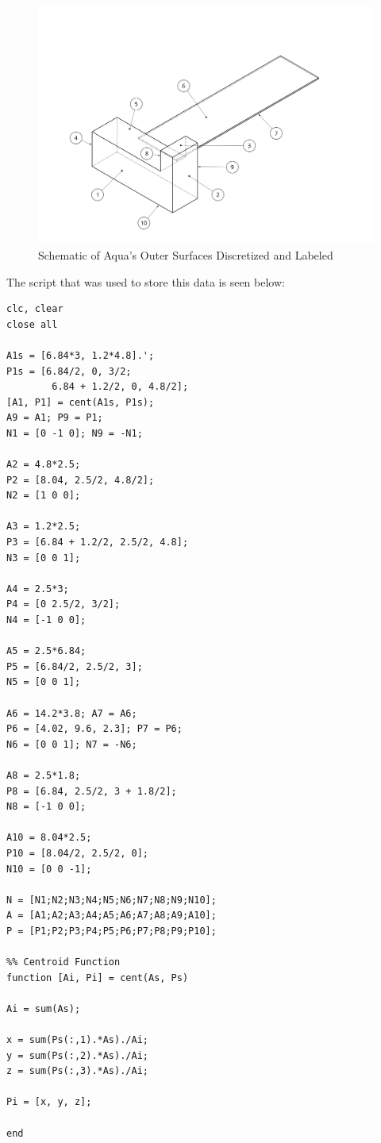 \begin{figure}[H]
    \centering
    \includegraphics[width = 14cm]{Images/AquaSurfaces.png}
    \caption{Schematic of Aqua's Outer Surfaces Discretized and Labeled}
    \label{fig:surface_labels}
\end{figure}

The script that was used to store this data is seen below:


\begin{lstlisting}
clc, clear
close all

A1s = [6.84*3, 1.2*4.8].';
P1s = [6.84/2, 0, 3/2;
        6.84 + 1.2/2, 0, 4.8/2];
[A1, P1] = cent(A1s, P1s);
A9 = A1; P9 = P1;
N1 = [0 -1 0]; N9 = -N1;

A2 = 4.8*2.5;
P2 = [8.04, 2.5/2, 4.8/2];
N2 = [1 0 0];

A3 = 1.2*2.5;
P3 = [6.84 + 1.2/2, 2.5/2, 4.8];
N3 = [0 0 1];

A4 = 2.5*3;
P4 = [0 2.5/2, 3/2];
N4 = [-1 0 0];

A5 = 2.5*6.84;
P5 = [6.84/2, 2.5/2, 3];
N5 = [0 0 1];

A6 = 14.2*3.8; A7 = A6;
P6 = [4.02, 9.6, 2.3]; P7 = P6;
N6 = [0 0 1]; N7 = -N6;

A8 = 2.5*1.8;
P8 = [6.84, 2.5/2, 3 + 1.8/2];
N8 = [-1 0 0];

A10 = 8.04*2.5;
P10 = [8.04/2, 2.5/2, 0];
N10 = [0 0 -1];

N = [N1;N2;N3;N4;N5;N6;N7;N8;N9;N10];
A = [A1;A2;A3;A4;A5;A6;A7;A8;A9;A10];
P = [P1;P2;P3;P4;P5;P6;P7;P8;P9;P10];

%% Centroid Function
function [Ai, Pi] = cent(As, Ps)

Ai = sum(As);

x = sum(Ps(:,1).*As)./Ai;
y = sum(Ps(:,2).*As)./Ai;
z = sum(Ps(:,3).*As)./Ai;

Pi = [x, y, z];

end
\end{lstlisting}